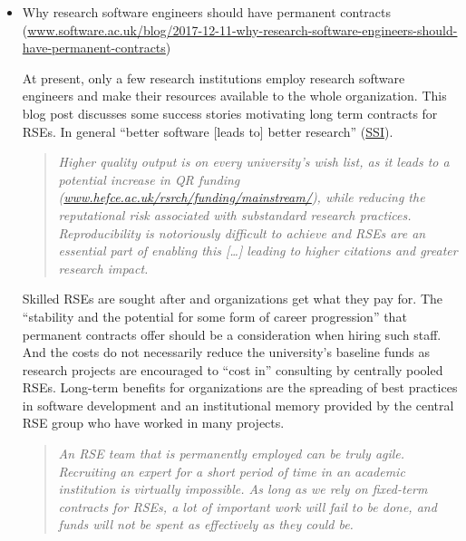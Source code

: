\documentclass[11pt,letterpaper]{article}
\begin{document}
\begin{itemize}
\item Why research software engineers should have permanent contracts \\(\href{https://www.software.ac.uk/blog/2017-12-11-why-research-software-engineers-should-have-permanent-contracts}{www.software.ac.uk/blog/2017-12-11-why-research-software-engineers-should-have-permanent-contracts})

\noindent At present, only a few research institutions employ research software engineers and make their resources available to the whole organization. This blog post discusses some success stories motivating long term contracts for RSEs. In general ``better software [leads to] better research'' (\href{https://software.ac.uk/}{SSI}).
\begin{quote}\textit{
Higher quality output is on every university's wish list, as it leads to a potential increase in QR funding (\href{http://www.hefce.ac.uk/rsrch/funding/mainstream/}{www.hefce.ac.uk/rsrch/funding/mainstream/}), while reducing the reputational risk associated with substandard research practices.
Reproducibility is notoriously difficult to achieve and RSEs are an essential part of enabling this [\ldots] leading to higher citations and greater research impact.}
\end{quote}
Skilled RSEs are sought after and organizations get what they pay for. The ``stability and the potential for some form of career progression'' that permanent contracts offer should be a consideration when hiring such staff. And the costs do not necessarily reduce the university's baseline funds as research projects are encouraged to ``cost in'' consulting by centrally pooled RSEs. Long-term benefits for organizations are the spreading of best practices in software development and an institutional memory provided by the central RSE group who have worked in many projects. 
\begin{quote}\textit{
An RSE team that is permanently employed can be truly agile. Recruiting an expert for a short period of time in an academic institution is virtually impossible. As long as we rely on fixed-term contracts for RSEs, a lot of important work will fail to be done, and funds will not be spent as effectively as they could be.}
\end{quote}


\end{itemize}
\end{document}
